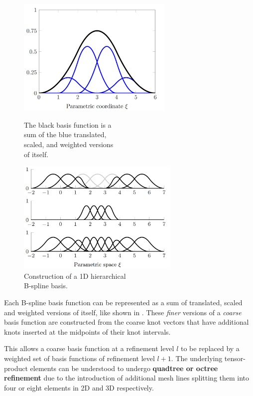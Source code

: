 \begin{figure}[H]
    \centering
    \begin{minipage}{0.5\textwidth}
        \centering
        \includegraphics[width = 7.5cm]{Figures/truncation.jpg}
        \caption{The black basis function is a \\ sum of the blue translated, \\ scaled, and weighted versions \\ of itself. }
        \label{fig:truncation}
    \end{minipage}%
    \begin{minipage}{0.5\textwidth}
        \centering
        \includegraphics[width = 7.8cm]{Figures/thb_basis.jpg}
        \caption{Construction of a 1D hierarchical \\ B-spline basis. }
        \label{fig:thb_basis}
    \end{minipage}
\end{figure}

Each B-spline basis function can be represented as a sum of translated, scaled and weighted versions of itself, like shown in . These \emph{finer} versions of a \emph{coarse} basis function are constructed from the coarse knot vectors that have additional knots inserted at the midpoints of their knot intervals.

This allows a coarse basis function at a refinement level $l$ to be replaced by a weighted set of basis functions of refinement level $l+1$. The underlying tensor-product elements can be understood to undergo \textbf{quadtree or octree refinement} due to the introduction of additional mesh lines splitting them into four or eight elements in 2D and 3D respectively.

